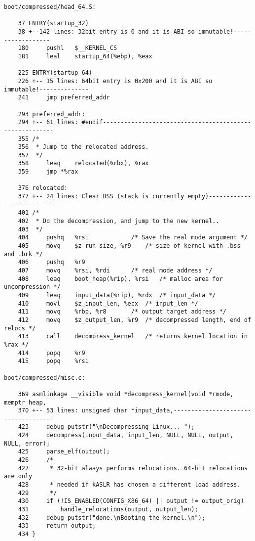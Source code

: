 \begin{framed}\begin{verbatim}
boot/compressed/head_64.S:

    37 ENTRY(startup_32)
    38 +--142 lines: 32bit entry is 0 and it is ABI so immutable!------------------
    180     pushl   $__KERNEL_CS
    181     leal    startup_64(%ebp), %eax

    225 ENTRY(startup_64)
    226 +-- 15 lines: 64bit entry is 0x200 and it is ABI so immutable!--------------
    241     jmp preferred_addr

    293 preferred_addr:
    294 +-- 61 lines: #endif--------------------------------------------------------
    355 /*
    356  * Jump to the relocated address.
    357  */
    358     leaq    relocated(%rbx), %rax
    359     jmp *%rax

    376 relocated:
    377 +-- 24 lines: Clear BSS (stack is currently empty)--------------------------
    401 /*
    402  * Do the decompression, and jump to the new kernel..
    403  */
    404     pushq   %rsi            /* Save the real mode argument */
    405     movq    $z_run_size, %r9    /* size of kernel with .bss and .brk */
    406     pushq   %r9
    407     movq    %rsi, %rdi      /* real mode address */
    408     leaq    boot_heap(%rip), %rsi   /* malloc area for uncompression */
    409     leaq    input_data(%rip), %rdx  /* input_data */
    410     movl    $z_input_len, %ecx  /* input_len */
    411     movq    %rbp, %r8       /* output target address */
    412     movq    $z_output_len, %r9  /* decompressed length, end of relocs */
    413     call    decompress_kernel   /* returns kernel location in %rax */
    414     popq    %r9
    415     popq    %rsi

boot/compressed/misc.c:

    369 asmlinkage __visible void *decompress_kernel(void *rmode, memptr heap,
    370 +-- 53 lines: unsigned char *input_data,------------------------------------
    423     debug_putstr("\nDecompressing Linux... ");
    424     decompress(input_data, input_len, NULL, NULL, output, NULL, error);
    425     parse_elf(output);
    426     /*
    427      * 32-bit always performs relocations. 64-bit relocations are only
    428      * needed if kASLR has chosen a different load address.
    429      */
    430     if (!IS_ENABLED(CONFIG_X86_64) || output != output_orig)
    431         handle_relocations(output, output_len);
    432     debug_putstr("done.\nBooting the kernel.\n");
    433     return output;
    434 }


\end{verbatim}
\end{framed}
